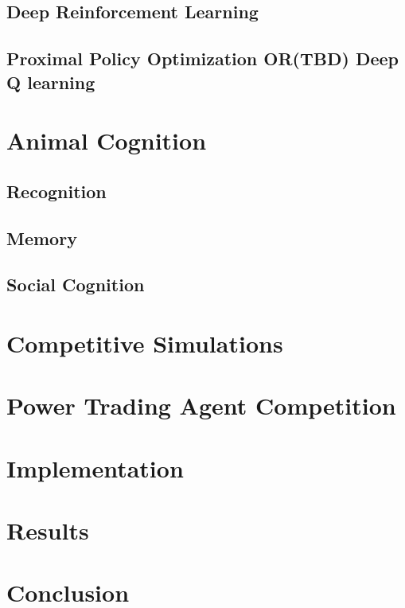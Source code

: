 \section{Deep Reinforcement Learning}

\section{Proximal Policy Optimization OR(TBD) Deep Q learning}

\chapter{Animal Cognition}
\section{Recognition}
\section{Memory}
\section{Social Cognition}

\chapter{Competitive Simulations}%

\chapter{Power Trading Agent Competition}


\chapter{Implementation}


\chapter{Results}
\chapter{Conclusion}

